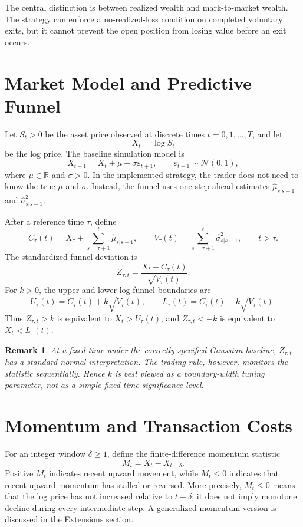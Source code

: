 \documentclass[11pt]{article}
\newtheorem{remark}{Remark}
\begin{document}
The central distinction is between realized wealth and mark-to-market wealth. The strategy can enforce a no-realized-loss condition on completed voluntary exits, but it cannot prevent the open position from losing value before an exit occurs.

\section{Market Model and Predictive Funnel}

Let \(S_t>0\) be the asset price observed at discrete times \(t=0,1,\ldots,T\), and let
\[
X_t=\log S_t
\]
be the log price. The baseline simulation model is
\[
X_{t+1}=X_t+\mu+\sigma\varepsilon_{t+1},
\qquad
\varepsilon_{t+1}\sim\mathcal N(0,1),
\]
where \(\mu\in\mathbb R\) and \(\sigma>0\). In the implemented strategy, the trader does not need to know the true \(\mu\) and \(\sigma\). Instead, the funnel uses one-step-ahead estimates \(\hat\mu_{s|s-1}\) and \(\hat\sigma^2_{s|s-1}\).

After a reference time \(\tau\), define
\[
C_\tau(t)
=
X_\tau+\sum_{s=\tau+1}^{t}\hat\mu_{s|s-1},
\qquad
V_\tau(t)
=
\sum_{s=\tau+1}^{t}\hat\sigma^2_{s|s-1},
\qquad t>\tau.
\]
The standardized funnel deviation is
\[
Z_{\tau,t}
=
\frac{X_t-C_\tau(t)}{\sqrt{V_\tau(t)}}.
\]
For \(k>0\), the upper and lower log-funnel boundaries are
\[
U_\tau(t)=C_\tau(t)+k\sqrt{V_\tau(t)},
\qquad
L_\tau(t)=C_\tau(t)-k\sqrt{V_\tau(t)}.
\]
Thus \(Z_{\tau,t}>k\) is equivalent to \(X_t>U_\tau(t)\), and \(Z_{\tau,t}<-k\) is equivalent to \(X_t<L_\tau(t)\).

\begin{remark}
At a fixed time under the correctly specified Gaussian baseline, \(Z_{\tau,t}\) has a standard normal interpretation. The trading rule, however, monitors the statistic sequentially. Hence \(k\) is best viewed as a boundary-width tuning parameter, not as a simple fixed-time significance level.
\end{remark}

\section{Momentum and Transaction Costs}

For an integer window \(\delta\geq 1\), define the finite-difference momentum statistic
\[
M_t=X_t-X_{t-\delta}.
\]
Positive \(M_t\) indicates recent upward movement, while \(M_t\leq 0\) indicates that recent upward momentum has stalled or reversed. More precisely, \(M_t\leq 0\) means that the log price has not increased relative to \(t-\delta\); it does not imply monotone decline during every intermediate step. A generalized momentum version is discussed in the Extensions section.
\end{document}
